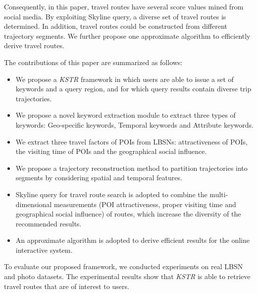 Consequently, in this paper, travel routes have several score values mined from social media. By exploiting Skyline query, a diverse set of travel routes is determined. In addition, travel routes could be constructed from different trajectory segments. We further propose one approximate algorithm to efficiently derive travel routes. %

The contributions of this paper are summarized as follows:
\begin{itemize}
  \item We propose a \textit{KSTR} framework in which users are able to issue a set of keywords and a query region, and for which query results contain diverse trip trajectories.  
  \item We propose a novel keyword extraction module to extract three types of keywords: Geo-specific keywords, Temporal keywords and Attribute keywords. %
  \item We extract three travel factors of POIs from LBSNs: attractiveness of POIs, the visiting time of POIs and the geographical social influence. 
  \item We propose a trajectory reconstruction method to partition trajectories into segments by considering spatial and temporal features. %
  \item Skyline query for travel route search is adopted to combine the multi-dimensional measurements (POI attractiveness, proper visiting time and geographical social influence) of routes, which increase the diversity of the recommended results. 
  \item An approximate algorithm is adopted to derive efficient results for the online interactive system.
\end{itemize}
To evaluate our proposed framework, we conducted experiments on real LBSN and photo datasets. The experimental results show that \textit{KSTR} is able to retrieve travel routes that are of interest to users.


